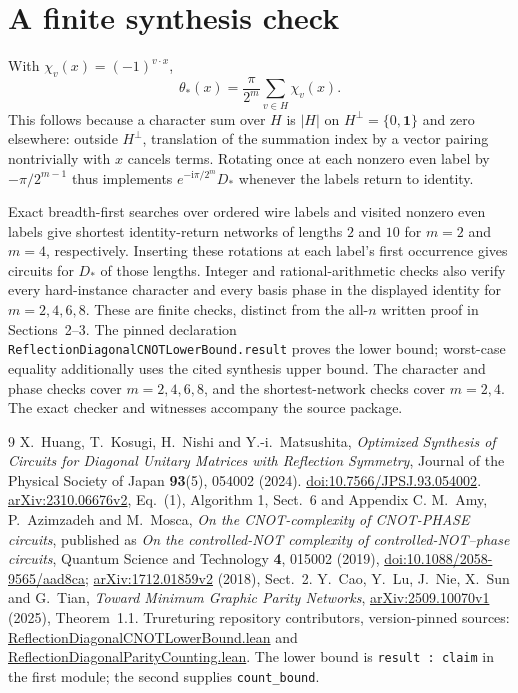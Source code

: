 \documentclass[11pt]{article}
\begin{document}
\section{A finite synthesis check}
With $\chi_v(x)=(-1)^{v\cdot x}$,
\[
 \theta_*(x)=\frac{\pi}{2^m}\sum_{v\in H}\chi_v(x).
\]
This follows because a character sum over $H$ is $|H|$ on
$H^\perp=\{0,\mathbf1\}$ and zero elsewhere: outside $H^\perp$,
translation of the summation index by a vector pairing nontrivially
with $x$ cancels terms. Rotating once at each nonzero even label by
$-\pi/2^{m-1}$ thus implements $e^{-\mathrm i\pi/2^m}D_*$ whenever
the labels return to identity.

Exact breadth-first searches over ordered wire labels and visited
nonzero even labels give shortest identity-return networks of lengths
$2$ and $10$ for $m=2$ and $m=4$, respectively. Inserting these rotations
at each label's first occurrence gives circuits for $D_*$ of those
lengths. Integer and rational-arithmetic checks also verify every
hard-instance character and every basis phase in the displayed identity
for $m=2,4,6,8$. These are finite checks, distinct from the all-$n$
written proof in Sections~2--3. The pinned declaration
\texttt{ReflectionDiagonalCNOTLowerBound.result} proves the lower bound;
worst-case equality additionally uses the cited synthesis upper bound.
The character and phase checks cover $m=2,4,6,8$, and the shortest-network
checks cover $m=2,4$. The exact checker and witnesses accompany
the source package.

\begin{thebibliography}{9}
X.~Huang, T.~Kosugi, H.~Nishi and Y.-i.~Matsushita,
\emph{Optimized Synthesis of Circuits for Diagonal Unitary Matrices
with Reflection Symmetry}, Journal of the Physical Society of Japan
\textbf{93}(5), 054002 (2024).
\href{https://doi.org/10.7566/JPSJ.93.054002}{doi:10.7566/JPSJ.93.054002}.
\href{https://arxiv.org/abs/2310.06676v2}{arXiv:2310.06676v2},
Eq.~(1), Algorithm 1, Sect.~6 and Appendix C.
M.~Amy, P.~Azimzadeh and M.~Mosca,
\emph{On the CNOT-complexity of CNOT-PHASE circuits},
published as \emph{On the controlled-NOT complexity of controlled-NOT--phase
circuits}, Quantum Science and Technology \textbf{4}, 015002 (2019),
\href{https://doi.org/10.1088/2058-9565/aad8ca}{doi:10.1088/2058-9565/aad8ca};
\href{https://arxiv.org/abs/1712.01859v2}{arXiv:1712.01859v2}
(2018), Sect.~2.
Y.~Cao, Y.~Lu, J.~Nie, X.~Sun and G.~Tian,
\emph{Toward Minimum Graphic Parity Networks},
\href{https://arxiv.org/abs/2509.10070v1}{arXiv:2509.10070v1}
(2025), Theorem~1.1.
Trureturing repository contributors, version-pinned sources:
\href{https://github.com/the-omega-institute/trureturing/blob/02c695f8c17e35965f80603427074b1dd434eed9/D5/S3/Quantum/Magic/ReflectionDiagonalCNOTLowerBound.lean}{ReflectionDiagonalCNOTLowerBound.lean}
and
\href{https://github.com/the-omega-institute/trureturing/blob/02c695f8c17e35965f80603427074b1dd434eed9/D5/S3/Quantum/Magic/ReflectionDiagonalParityCounting.lean}{ReflectionDiagonalParityCounting.lean}.
The lower bound is \texttt{result : claim} in the first module;
the second supplies \texttt{count\_bound}.
\end{thebibliography}
\end{document}
